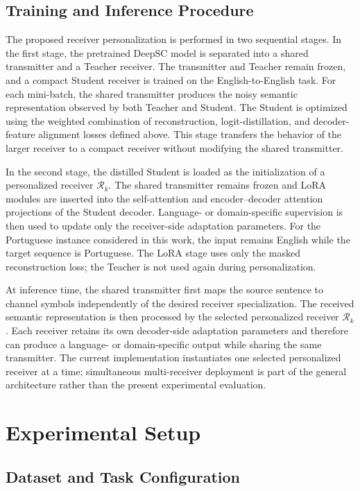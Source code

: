 \documentclass[conference]{IEEEtran}
\begin{document}
\subsection{Training and Inference Procedure}

The proposed receiver personalization is performed in two sequential stages. In the first stage, the pretrained DeepSC model is separated into a shared transmitter and a Teacher receiver. The transmitter and Teacher remain frozen, and a compact Student receiver is trained on the English-to-English task. For each mini-batch, the shared transmitter produces the noisy semantic representation observed by both Teacher and Student. The Student is optimized using the weighted combination of reconstruction, logit-distillation, and decoder-feature alignment losses defined above. This stage transfers the behavior of the larger receiver to a compact receiver without modifying the shared transmitter.

In the second stage, the distilled Student is loaded as the initialization of a personalized receiver $\mathcal{R}_k$. The shared transmitter remains frozen and LoRA modules are inserted into the self-attention and encoder--decoder attention projections of the Student decoder. Language- or domain-specific supervision is then used to update only the receiver-side adaptation parameters. For the Portuguese instance considered in this work, the input remains English while the target sequence is Portuguese. The LoRA stage uses only the masked reconstruction loss; the Teacher is not used again during personalization.

At inference time, the shared transmitter first maps the source sentence to channel symbols independently of the desired receiver specialization. The received semantic representation is then processed by the selected personalized receiver $\mathcal{R}_k$. Each receiver retains its own decoder-side adaptation parameters and therefore can produce a language- or domain-specific output while sharing the same transmitter. The current implementation instantiates one selected personalized receiver at a time; simultaneous multi-receiver deployment is part of the general architecture rather than the present experimental evaluation.

\section{Experimental Setup}

\subsection{Dataset and Task Configuration}
\end{document}
